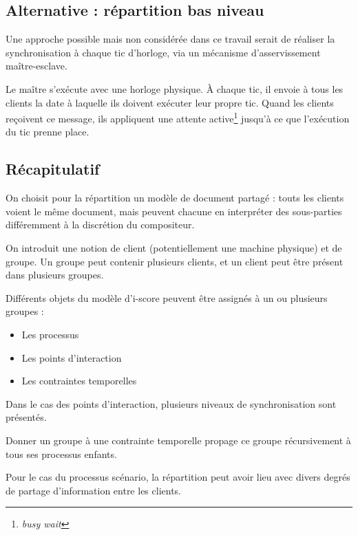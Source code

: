 \documentclass{article}
\begin{document}
\subsection{Alternative : répartition bas niveau}
Une approche possible mais non considérée dans ce travail serait de réaliser la synchronisation à chaque tic d'horloge, via un mécanisme d'asservissement maître-esclave.

Le maître s'exécute avec une horloge physique.
À chaque tic, il envoie à tous les clients la date à laquelle ils doivent exécuter leur propre tic. 
Quand les clients reçoivent ce message, ils appliquent une attente active\footnote{\textit{busy wait}} jusqu'à ce que l'exécution du tic prenne place.
\subsection{Récapitulatif}
On choisit pour la répartition un modèle de document partagé : touts les clients voient le même document, mais peuvent chacune en interpréter des sous-parties différemment à la discrétion du compositeur.

On introduit une notion de client (potentiellement une machine physique) et de groupe.
Un groupe peut contenir plusieurs clients, et un client peut être présent dans plusieurs groupes.

Différents objets du modèle d'i-score peuvent être assignés à un ou plusieurs groupes : 

\begin{itemize}
	\item Les processus
	\item Les points d'interaction
	\item Les contraintes temporelles
\end{itemize}

Dans le cas des points d'interaction, plusieurs niveaux de synchronisation sont présentés.

Donner un groupe à une contrainte temporelle propage ce groupe récursivement à tous ses processus enfants.

Pour le cas du processus scénario, la répartition peut avoir lieu avec divers degrés de partage d'information entre les clients.

\end{document}
